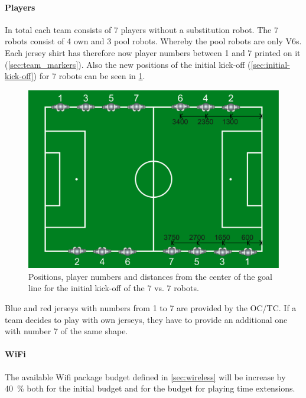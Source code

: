         \paragraph{Players}
            In total each team consists of 7 players without a substitution robot. The 7 robots consist of 4 own and 3 pool robots. Whereby the pool robots are only V6s. Each jersey shirt has therefore now player numbers between 1 and 7 printed on it (\cf \cref{sec:team_markers}). Also the new positions of the initial kick-off (\cf \cref{sec:initial-kick-off}) for 7 robots can be seen in \cref{fig:initial_positions_7vs7}.
            \begin{figure}[t!]
            	\begin{center}
            		\leavevmode
            		\includegraphics[width=1\columnwidth]{figs/initial_positions_7vs7.pdf}
            		\caption{Positions, player numbers and distances from the center of the goal line for the initial kick-off of the 7 vs. 7 robots.}
            		\label{fig:initial_positions_7vs7}
            	\end{center}
            \end{figure}
            Blue and red jerseys with numbers from 1 to 7 are provided by the OC/TC. If a team decides to play with own jerseys, they have to provide an additional one with number 7 of the same shape. 

        \paragraph{WiFi}
            The available Wifi package budget defined in \cref{sec:wireless} will be increase by \qty{40}{\percent} both for the initial budget and for the budget for playing time extensions.  

